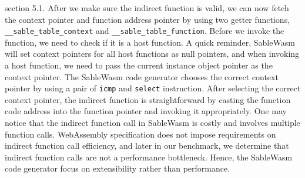 section 5.1. After we make sure the indirect function is valid, we can now
fetch the context pointer and function address pointer by using two getter
functions, \texttt{\_\_sable\_table\_context} and
\texttt{\_\_sable\_table\_function}. Before we invoke the function, we need to
check if it is a host function. A quick reminder, SableWasm will set context
pointers for all host functions as null pointers, and when invoking a host
function, we need to pass the current instance object pointer as the context
pointer. The SableWasm code generator chooses the correct context pointer by
using a pair of \texttt{icmp} and \texttt{select} instruction. After selecting
the correct context pointer, the indirect function is straightforward by
casting the function code address into the function pointer and invoking it
appropriately. One may notice that the indirect function call in SableWasm is
costly and involves multiple function calls. WebAssembly specification does not
impose requirements on indirect function call efficiency, and later in our
benchmark, we determine that indirect function calls are not a performance
bottleneck. Hence, the SableWasm code generator focus on extensibility rather
than performance.

